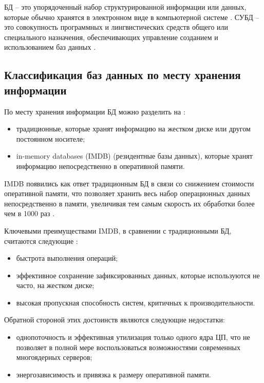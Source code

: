 БД -- это упорядоченный набор структурированной информации или данных, которые обычно хранятся в электронном виде в компьютерной системе \cite{database}. СУБД -- это совокупность программных и лингвистических средств общего или специального назначения, обеспечивающих управление созданием и использованием баз данных \cite{database}.

\subsection{Классификация баз данных по месту хранения информации}

По месту хранения информации БД можно разделить на \cite{inmemory}:
\begin{itemize}
	\item традиционные, которые хранят информацию на жестком диске или другом постоянном носителе; 
	\item in-memory databases (IMDB) (резидентные базы данных), которые хранят информацию непосредственно в оперативной памяти.
\end{itemize}

IMDB появились как ответ традиционным БД в связи со снижением стоимости оперативной памяти, что позволяет хранить весь набор операционных данных непосредственно в памяти, увеличивая тем самым скорость их обработки более чем в 1000 раз \cite{why}.

Ключевыми преимуществами IMDB, в сравнении с традиционными БД, считаются следующие \cite{adv}:

\begin{itemize}
	\item быстрота выполнения операций;
	\item эффективное сохранение зафиксированных данных, которые используются не часто, на жестком диске;
	\item высокая пропускная способность систем, критичных к производительности.
\end{itemize}

Обратной стороной этих достоинств являются следующие недостатки:
\begin{itemize}
	\item однопоточность и эффективная утилизация только одного ядра ЦП, что не позволяет в полной мере воспользоваться возможностями современных многоядерных серверов;
	\item энергозависимость и привязка к размеру оперативной памяти.
\end{itemize}

